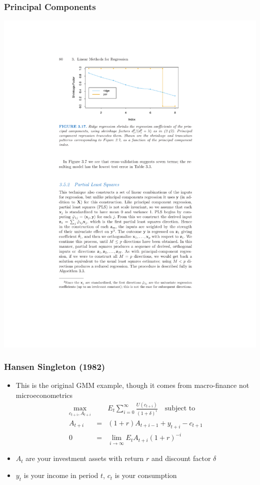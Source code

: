\documentclass[xcolor=pdftex,dvipsnames,table,mathserif,aspectratio=169]{beamer}
\begin{document}
\begin{frame}
\frametitle{Principal Components}
\begin{center}
\includegraphics[height=0.85\textheight]{./resources/pcrridge}
\end{center}
\end{frame}



\begin{frame}
\frametitle{Hansen Singleton (1982)}
\begin{itemize}
\item This is the original GMM example, though it comes from macro-finance not microeconometrics
\begin{eqnarray*}
\max_{c_{t+i},A_{t+i}}&& E_t \sum_{i=0}^{\infty} \frac{U(c_{t+i})}{(1+\delta)^i} \quad \mbox{subject to } \\
A_{t+i} &=& (1+r) A_{t+i-1} + y_{t+i} - c_{t+1} \\
0&=&\lim_{i \rightarrow \infty} E_t A_{t+i} (1+r)^{-i} 
\end{eqnarray*}
\item $A_t$ are your investment assets with return $r$ and discount factor $\delta$
\item $y_t$ is your income in period $t$, $c_t$ is your consumption 
\end{itemize}
\end{frame}
\end{document}
